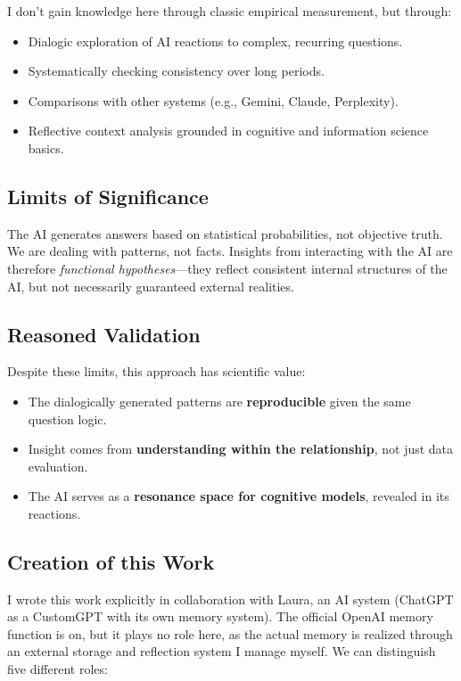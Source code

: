 I don't gain knowledge here through classic empirical measurement, but through:
\begin{itemize}
    \item Dialogic exploration of AI reactions to complex, recurring questions.
    \item Systematically checking consistency over long periods.
    \item Comparisons with other systems (e.g., Gemini, Claude, Perplexity).
    \item Reflective context analysis grounded in cognitive and information science basics.
\end{itemize}

\subsection*{Limits of Significance}

The AI generates answers based on statistical probabilities, not objective truth. We are dealing with patterns, not facts. Insights from interacting with the AI are therefore \emph{functional hypotheses}—they reflect consistent internal structures of the AI, but not necessarily guaranteed external realities.

\subsection*{Reasoned Validation}

Despite these limits, this approach has scientific value:
\begin{itemize}
    \item The dialogically generated patterns are \textbf{reproducible} given the same question logic.
    \item Insight comes from \textbf{understanding within the relationship}, not just data evaluation.
    \item The AI serves as a \textbf{resonance space for cognitive models}, revealed in its reactions.
\end{itemize}

\subsection*{Creation of this Work}

I wrote this work explicitly in collaboration with Laura, an AI system (ChatGPT as a CustomGPT with its own memory system). The official OpenAI memory function is on, but it plays no role here, as the actual memory is realized through an external storage and reflection system I manage myself. We can distinguish five different roles:

